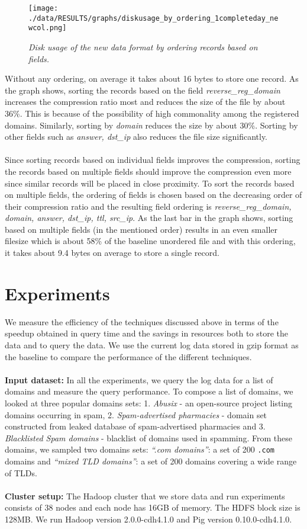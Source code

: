\documentclass[11pt,a4paper]{article}
\begin{document}
\begin{figure}[H] 
\centering
\texttt{[image: ./data/RESULTS/graphs/diskusage\_by\_ordering\_1completeday\_newcol.png]}
\caption {\textit{Disk usage of the new data format by ordering records based on fields.}}
\end{figure}

\noindent
Without any ordering, on average it takes about 16 bytes to store one record. As the graph shows, sorting the records based on the field \textit{reverse\_reg\_domain} increases the compression ratio most and reduces the size of the file by about 36\%. This is because of the possibility of high commonality among the registered domains. Similarly, sorting by \textit{domain} reduces the size by about 30\%. Sorting by other fields such as \textit{answer, dst\_ip} also reduces the file size significantly.
\\\\
Since sorting records based on individual fields improves the compression, sorting the records based on multiple fields should improve the compression even more since similar records will be placed in close proximity. To sort the records based on multiple fields, the ordering of fields is chosen based on the decreasing order of their compression ratio and the resulting field ordering is \textit{reverse\_reg\_domain, domain, answer, dst\_ip, ttl, src\_ip}. As the last bar in the graph shows, sorting based on multiple fields (in the mentioned order) results in an even smaller filesize which is about 58\% of the baseline unordered file and with this ordering, it takes about 9.4 bytes on average to store a single record.

\section {Experiments}
We measure the efficiency of the techniques discussed above in terms of the speedup obtained in query time and the savings in resources both to store the data and to query the data. We use the current log data stored in gzip format as the baseline to compare the performance of the different techniques.
\\\\
\textbf{Input dataset:} In all the experiments, we query the log data for a list of domains and measure the query performance. To compose a list of domains, we looked at three popular domains sets: 1. \textit{Abusix}\cite{abusix} - an open-source project listing domains occurring in spam, 2. \textit{Spam-advertised pharmacies}\cite{pharmaleaks} - domain set constructed from leaked database of spam-advertised pharmacies and 3. \textit{Blacklisted Spam domains}\cite{spooky} - blacklist of domains used in spamming.
From these domains, we sampled two domains sets: \textit{``.com domains''}: a set of 200 \texttt{.com} domains and \textit{``mixed TLD domains''}: a set of 200 domains covering a wide range of TLDs.
\\\\
\textbf{Cluster setup:} The Hadoop cluster that we store data and run experiments consists of 38 nodes and each node has 16GB of memory. The HDFS block size is 128MB. We run Hadoop version 2.0.0-cdh4.1.0 and Pig version 0.10.0-cdh4.1.0.
\end{document}
